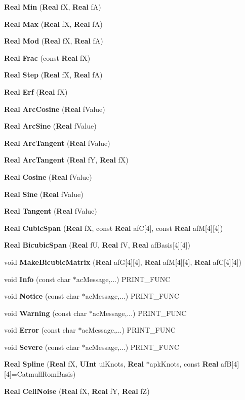 \begin{CompactItemize}
{\bf Real} {\bf Min} ({\bf Real} f\-X, {\bf Real} f\-A)
\item 
{\bf Real} {\bf Max} ({\bf Real} f\-X, {\bf Real} f\-A)
\item 
{\bf Real} {\bf Mod} ({\bf Real} f\-X, {\bf Real} f\-A)
\item 
{\bf Real} {\bf Frac} (const {\bf Real} f\-X)
\item 
{\bf Real} {\bf Step} ({\bf Real} f\-X, {\bf Real} f\-A)
\item 
{\bf Real} {\bf Erf} ({\bf Real} f\-X)
\item 
{\bf Real} {\bf Arc\-Cosine} ({\bf Real} f\-Value)
\item 
{\bf Real} {\bf Arc\-Sine} ({\bf Real} f\-Value)
\item 
{\bf Real} {\bf Arc\-Tangent} ({\bf Real} f\-Value)
\item 
{\bf Real} {\bf Arc\-Tangent} ({\bf Real} f\-Y, {\bf Real} f\-X)
\item 
{\bf Real} {\bf Cosine} ({\bf Real} f\-Value)
\item 
{\bf Real} {\bf Sine} ({\bf Real} f\-Value)
\item 
{\bf Real} {\bf Tangent} ({\bf Real} f\-Value)
\item 
{\bf Real} {\bf Cubic\-Span} ({\bf Real} f\-X, const {\bf Real} af\-C[4], const {\bf Real} af\-M[4][4])
\item 
{\bf Real} {\bf Bicubic\-Span} ({\bf Real} f\-U, {\bf Real} f\-V, {\bf Real} af\-Basis[4][4])
\item 
void {\bf Make\-Bicubic\-Matrix} ({\bf Real} af\-G[4][4], {\bf Real} af\-M[4][4], {\bf Real} af\-C[4][4])
\item 
void {\bf Info} (const char $\ast$ac\-Message,...) PRINT\_\-FUNC
\item 
void {\bf Notice} (const char $\ast$ac\-Message,...) PRINT\_\-FUNC
\item 
void {\bf Warning} (const char $\ast$ac\-Message,...) PRINT\_\-FUNC
\item 
void {\bf Error} (const char $\ast$ac\-Message,...) PRINT\_\-FUNC
\item 
void {\bf Severe} (const char $\ast$ac\-Message,...) PRINT\_\-FUNC
\item 
{\bf Real} {\bf Spline} ({\bf Real} f\-X, {\bf UInt} ui\-Knots, {\bf Real} $\ast$apk\-Knots, const {\bf Real} af\-B[4][4]=Catmull\-Rom\-Basis)
\item 
{\bf Real} {\bf Cell\-Noise} ({\bf Real} f\-X, {\bf Real} f\-Y, {\bf Real} f\-Z)
\item 

\end{CompactItemize}
